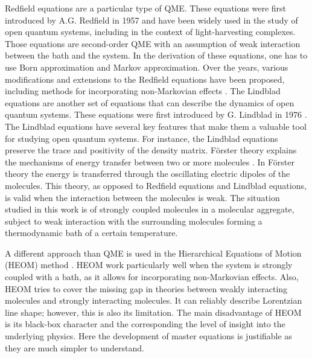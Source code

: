 Redfield equations are a particular type of QME. These equations were first introduced by A.G. Redfield in 1957 \cite{redfield_theory_1957} and have been widely used in the study of open quantum systems, including in the context of light-harvesting complexes. Those equations are second-order QME 
with an assumption of weak interaction between the bath and the system. In the derivation of these equations, one has to use Born approximation and Markov approximation. Over the years, various modifications and extensions to the Redfield equations have been proposed, including methods for incorporating non-Markovian effects \cite{breuer_theory_2002}.
The Lindblad equations are another set of equations that can describe the dynamics of open quantum systems. These equations were first introduced by G. Lindblad in 1976 \cite{lindblad_generators_1976}. The Lindblad equations have several key features that make them a valuable tool for studying open quantum systems. For instance, the Lindblad equations preserve the trace and positivity of the density matrix. %
Förster theory explains the mechanisms of energy transfer between two or more molecules \cite{forster_zwischenmolekulare_1948}. In Förster theory the energy is transferred through the oscillating electric dipoles of the molecules. This theory, as opposed to Redfield equations and Lindblad equations, is valid when the interaction between the molecules is weak. The situation studied in this work is of strongly coupled molecules in a molecular aggregate, subject to weak interaction with the surrounding molecules forming a thermodynamic bath of a certain temperature.

A different approach than QME is used in the Hierarchical Equations of Motion (HEOM) method \cite{tanimura_time_1989}. HEOM work particularly well when the system is strongly coupled with a bath, as it allows for incorporating non-Markovian effects. Also, HEOM tries to cover the missing gap in theories between weakly interacting molecules and strongly interacting molecules. It can reliably describe Lorentzian line shape; however, this is also its limitation. The main disadvantage of HEOM is its black-box character and the corresponding the level of insight into the underlying physics. Here the development of  master equations is justifiable as they are much simpler to understand. 

